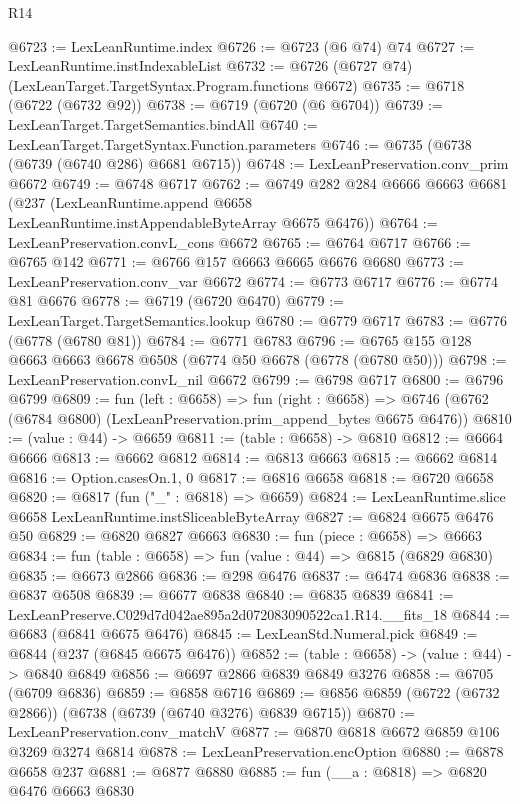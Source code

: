 \begin{lexlean}{R14}
\begin{coremodule}
@6723 := LexLeanRuntime.index
@6726 := @6723 (@6 @74) @74
@6727 := LexLeanRuntime.instIndexableList
@6732 := @6726 (@6727 @74) (LexLeanTarget.TargetSyntax.Program.functions @6672)
@6735 := @6718 (@6722 (@6732 @92))
@6738 := @6719 (@6720 (@6 @6704))
@6739 := LexLeanTarget.TargetSemantics.bindAll
@6740 := LexLeanTarget.TargetSyntax.Function.parameters
@6746 := @6735 (@6738 (@6739 (@6740 @286) @6681 @6715))
@6748 := LexLeanPreservation.conv_prim @6672
@6749 := @6748 @6717
@6762 := @6749
    @282
    @284
    @6666
    @6663
    @6681
    (@237 (LexLeanRuntime.append @6658 LexLeanRuntime.instAppendableByteArray @6675 @6476))
@6764 := LexLeanPreservation.convL_cons @6672
@6765 := @6764 @6717
@6766 := @6765 @142
@6771 := @6766 @157 @6663 @6665 @6676 @6680
@6773 := LexLeanPreservation.conv_var @6672
@6774 := @6773 @6717
@6776 := @6774 @81 @6676
@6778 := @6719 (@6720 @6470)
@6779 := LexLeanTarget.TargetSemantics.lookup
@6780 := @6779 @6717
@6783 := @6776 (@6778 (@6780 @81))
@6784 := @6771 @6783
@6796 := @6765 @155 @128 @6663 @6663 @6678 @6508 (@6774 @50 @6678 (@6778 (@6780 @50)))
@6798 := LexLeanPreservation.convL_nil @6672
@6799 := @6798 @6717
@6800 := @6796 @6799
@6809 := fun (left : @6658) =>
  fun (right : @6658) =>
  @6746 (@6762 (@6784 @6800) (LexLeanPreservation.prim_append_bytes @6675 @6476))
@6810 := (value : @44) -> @6659
@6811 := (table : @6658) -> @6810
@6812 := @6664 @6666
@6813 := @6662 @6812
@6814 := @6813 @6663
@6815 := @6662 @6814
@6816 := Option.casesOn.{1, 0}
@6817 := @6816 @6658
@6818 := @6720 @6658
@6820 := @6817 (fun ("_" : @6818) => @6659)
@6824 := LexLeanRuntime.slice @6658 LexLeanRuntime.instSliceableByteArray
@6827 := @6824 @6675 @6476 @50
@6829 := @6820 @6827 @6663
@6830 := fun (piece : @6658) => @6663
@6834 := fun (table : @6658) => fun (value : @44) => @6815 (@6829 @6830)
@6835 := @6673 @2866
@6836 := @298 @6476
@6837 := @6474 @6836
@6838 := @6837 @6508
@6839 := @6677 @6838
@6840 := @6835 @6839
@6841 := LexLeanPreserve.C029d7d042ae895a2d072083090522ca1.R14.__fits_18
@6844 := @6683 (@6841 @6675 @6476)
@6845 := LexLeanStd.Numeral.pick
@6849 := @6844 (@237 (@6845 @6675 @6476))
@6852 := (table : @6658) -> (value : @44) -> @6840 @6849
@6856 := @6697 @2866 @6839 @6849 @3276
@6858 := @6705 (@6709 @6836)
@6859 := @6858 @6716
@6869 := @6856 @6859 (@6722 (@6732 @2866)) (@6738 (@6739 (@6740 @3276) @6839 @6715))
@6870 := LexLeanPreservation.conv_matchV
@6877 := @6870 @6818 @6672 @6859 @106 @3269 @3274 @6814
@6878 := LexLeanPreservation.encOption
@6880 := @6878 @6658 @237
@6881 := @6877 @6880
@6885 := fun (__a : @6818) => @6820 @6476 @6663 @6830

\end{coremodule}
\end{lexlean}
